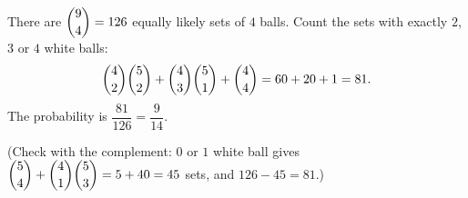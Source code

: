 There are $\dbinom94=126$ equally likely sets of $4$ balls. Count the sets with exactly $2$, $3$ or $4$ white balls:
\[\dbinom42\dbinom52+\dbinom43\dbinom51+\dbinom44=60+20+1=81.\]
The probability is $\dfrac{81}{126}=\boxed{\dfrac{9}{14}}$.

(Check with the complement: $0$ or $1$ white ball gives $\dbinom54+\dbinom41\dbinom53=5+40=45$ sets, and $126-45=81$.)

